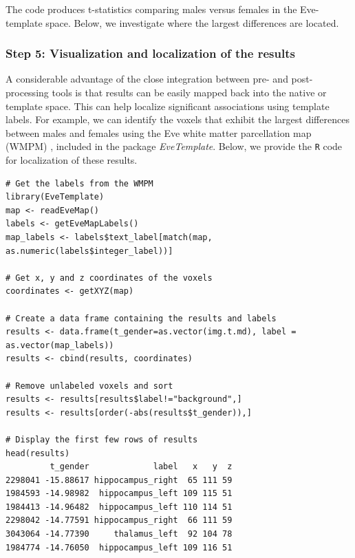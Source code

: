 \documentclass[]{elsarticle} %
\newcommand{\pkg}[1]{\emph{#1}}
\newcommand{\rlang}{\texttt{R}}
\begin{document}
The code produces t-statistics comparing males versus females in the Eve-template space.  Below, we investigate where the largest differences are located. 

\subsubsection{Step 5: Visualization and localization of the results}

A considerable advantage of the close integration between pre- and post-processing tools is that results can be easily mapped back into the native or template space. This can help localize significant associations using template labels. For example, we can identify the voxels that exhibit the largest differences between males and females using the Eve white matter parcellation map (WMPM) \citep{eve}, included in the package \pkg{EveTemplate}. Below, we provide the {\rlang}  code for localization of these results.

\color{blue}
\begin{verbatim}
# Get the labels from the WMPM
library(EveTemplate)
map <- readEveMap()
labels <- getEveMapLabels()
map_labels <- labels$text_label[match(map, as.numeric(labels$integer_label))] 

# Get x, y and z coordinates of the voxels
coordinates <- getXYZ(map)

# Create a data frame containing the results and labels
results <- data.frame(t_gender=as.vector(img.t.md), label = as.vector(map_labels))
results <- cbind(results, coordinates)

# Remove unlabeled voxels and sort  
results <- results[results$label!="background",]
results <- results[order(-abs(results$t_gender)),]

# Display the first few rows of results
head(results)
         t_gender             label   x   y  z
2298041 -15.88617 hippocampus_right  65 111 59
1984593 -14.98982  hippocampus_left 109 115 51
1984413 -14.96482  hippocampus_left 110 114 51
2298042 -14.77591 hippocampus_right  66 111 59
3043064 -14.77390     thalamus_left  92 104 78
1984774 -14.76050  hippocampus_left 109 116 51
\end{verbatim}
\color{black}
\end{document}

